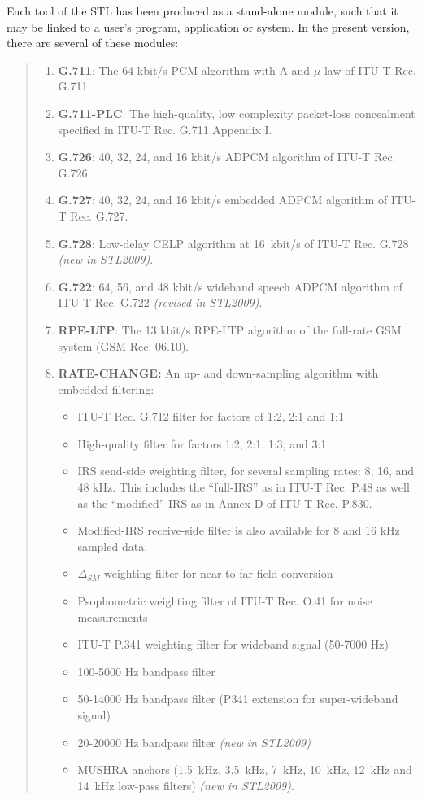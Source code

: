 Each tool of the STL has been produced as a stand-alone module, such
that it may be linked to a user's program, application or system. In
the present version, there are several of these modules:

\begin{quote}
\begin{enumerate}
\item {\bf G.711}: The 64 kbit/s PCM algorithm with A and $\mu$ law of
  ITU-T Rec. G.711.

\item {\bf G.711-PLC}: The high-quality, low complexity packet-loss
  concealment specified in ITU-T Rec. G.711 Appendix I.

\item {\bf G.726}: 40, 32, 24, and 16 kbit/s ADPCM algorithm of ITU-T
  Rec. G.726.

\item {\bf G.727}: 40, 32, 24, and 16 kbit/s embedded ADPCM
  algorithm of ITU-T Rec. G.727.
 
\item {\bf G.728}: Low-delay CELP algorithm at 16~kbit/s of ITU-T
  Rec. G.728 \emph{(new in STL2009)}.

\item {\bf G.722}: 64, 56, and 48 kbit/s wideband speech ADPCM
  algorithm of ITU-T Rec. G.722 \emph{(revised in STL2009)}.

\item {\bf RPE-LTP}: The 13 kbit/s RPE-LTP algorithm of the full-rate
  GSM system (GSM Rec. 06.10).
        
\item {\bf RATE-CHANGE:} An up- and down-sampling algorithm with
  embedded filtering:
  \begin{itemize}
  \item ITU-T Rec. G.712 filter for factors of 1:2, 2:1 and 1:1
  \item High-quality filter for factors 1:2, 2:1, 1:3, and 3:1
  \item IRS send-side weighting filter, for several sampling rates: 8,
    16, and 48 kHz. This includes the ``full-IRS'' as in ITU-T
    Rec. P.48 as well as the ``modified'' IRS as in Annex D of ITU-T
    Rec. P.830.
  \item Modified-IRS receive-side filter is also available for
    8 and 16 kHz sampled data.
  \item $\Delta_{SM}$ weighting filter for near-to-far field conversion
  \item Psophometric weighting filter of ITU-T Rec. O.41 for noise
    measurements
  \item ITU-T P.341 weighting filter for wideband signal (50-7000 Hz)
  \item  100-5000 Hz bandpass filter
  \item  50-14000 Hz bandpass filter (P341 extension for
    super-wideband signal)
  \item  20-20000 Hz bandpass filter \emph{(new in STL2009)}
  \item MUSHRA anchors (1.5~kHz, 3.5~kHz, 7~kHz, 10~kHz, 12~kHz
    and 14~kHz low-pass filters) \emph{(new in STL2009)}.
  \end{itemize}


\end{enumerate}
\end{quote}
